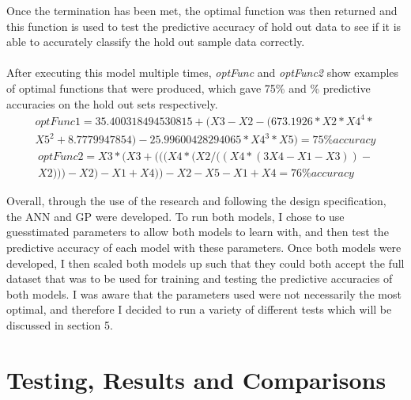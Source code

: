 \documentclass[11pt]{article}
\begin{document}
Once the termination has been met, the optimal function was then returned and this function is used to test the predictive accuracy of hold out data to see if it is able to accurately classify the hold out sample data correctly. \\\\
After executing this model multiple times, \textit{optFunc} and \textit{optFunc2} show examples of optimal functions that were produced, which gave 75\% and \% predictive accuracies on the hold out sets respectively. 
\begin{align*}
optFunc1=  35.400318494530815+(X3-X2-(673.1926*X2*X4^4*\\
X5^2+8.7779947854)-25.99600428294065*X4^3*X5) = 75\%  accuracy
\end{align*}
\begin{align*}
optFunc2 = X3*(X3+(((X4*(X2/((X4*(3X4-X1-X3))-\\
X2)))-X2)-X1+X4))-X2-X5-X1+X4 = 76\%  accuracy
\end{align*}

Overall, through the use of the research and following the design specification, the ANN and GP were developed. To run both models, I chose to use guesstimated parameters to allow both models to learn with, and then test the predictive accuracy of each model with these parameters. Once both models were developed, I then scaled both models up such that they could both accept the full dataset that was to be used for training and testing the predictive accuracies of both models. I was aware that the parameters used were not necessarily the most optimal, and therefore I decided to run a variety of different tests which will be discussed in section 5. 
\section{Testing, Results and Comparisons} %
\end{document}
